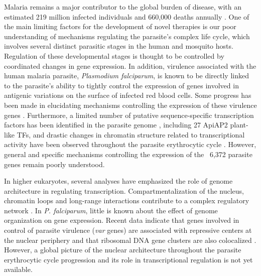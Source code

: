 Malaria remains a major contributor to the global burden of disease, with an
estimated 219 million infected individuals and 660,000 deaths annually
\citep{who:malaria}. One of the main limiting factors for the development of
novel therapies is our poor understanding of mechanisms regulating the
parasite's complex life cycle, which involves several distinct parasitic
stages in the human and mosquito hosts. Regulation of these developmental
stages is thought to be controlled by coordinated changes in gene expression.
In addition, virulence associated with the human malaria parasite, {\em
Plasmodium falciparum}, is known to be directly linked to the parasite's
ability to tightly control the expression of genes involved in antigenic
variations on the surface of infected red blood cells. Some progress has been
made in elucidating mechanisms controlling the expression of these virulence
genes \citep{duraisingh:heterochromatin, freitas-junior:telomeric}.
Furthermore, a limited number of putative sequence-specific transcription
factors has been identified in the parasite genome \citep{balaji:discovery,
coulson:comparative}, including 27 ApiAP2 plant-like TFs, and drastic changes
in chromatin structure related to transcriptional activity have been observed
throughout the parasite erythrocytic cycle \citep{ponts:nucleosome}. However,
general and specific mechanisms controlling the expression of the ~6,372
parasite genes remain poorly understood.

In higher eukaryotes, several analyses have emphasized the role of genome
architecture in regulating transcription. Compartmentalization of the nucleus,
chromatin loops and long-range interactions contribute to a complex regulatory
network \citep{homouz:3d, kalhor:genome,  lieberman-aiden:comprehensive,
dixon:topological}. In {\em P. falciparum}, little is known about the effect
of genome organization on gene expression. Recent data indicate that genes
involved in control of parasite virulence ({\em var} genes) are associated
with repressive centers at the nuclear periphery
\citep{duraisingh:heterochromatin, dzikowski:mechanisms,
lopez-rubio:genome-wide} and that ribosomal DNA gene clusters are also
colocalized \citep{mancio-silva:clustering, lemieux:genome-wide}. However, a
global picture of the nuclear architecture throughout the parasite
erythrocytic cycle progression and its role in transcriptional regulation is
not yet available.

